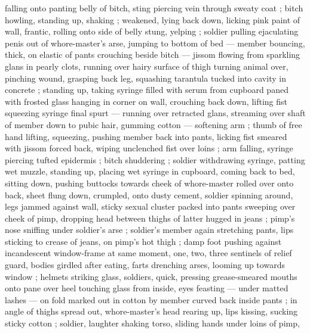 falling onto panting belly of bitch, sting piercing vein through sweaty coat ; bitch howling, standing up, shaking ; weakened, lying back down, licking pink paint of wall, frantic, rolling onto side of belly stung, yelping ; soldier pulling ejaculating penis out of whore-master's arse, jumping to bottom of bed --- member bouncing, thick, on elastic of pants {\dashcom} crouching beside bitch --- jissom flowing from sparkling glans in pearly clots, running over hairy surface of thigh {\dashcom} turning animal over, pinching wound, grasping back leg, squashing tarantula tucked into cavity in concrete ; standing up, taking syringe filled with serum from cupboard paned with frosted glass hanging in corner on wall, crouching back down, lifting fist squeezing syringe {\col} final spurt --- running over retracted glans, streaming over shaft of member down to pubic hair, gumming cotton --- softening arm ; thumb of free hand lifting, squeezing, pushing member back into pants, licking fist smeared with jissom forced back, wiping unclenched fist over loins ; arm falling, syringe piercing tufted epidermis ; bitch shuddering ; soldier withdrawing syringe, patting wet muzzle, standing up, placing wet syringe in cupboard, coming back to bed, sitting down, pushing buttocks towards cheek of whore-master rolled over onto back, sheet flung down, crumpled, onto dusty cement, soldier spinning around, legs jammed against wall, sticky sexual cluster packed into pants sweeping over cheek of pimp, dropping head between thighs of latter hugged in jeans ; pimp's nose sniffing under soldier's arse ; soldier's member again stretching pants, lips sticking to crease of jeans, on pimp's hot thigh ; damp foot pushing against incandescent window-frame {\col} at same moment, one, two, three sentinels of relief guard, bodies girdled after eating, farts drenching arses, looming up towards window ; helmets striking glass, soldiers, quick, pressing grease-smeared mouths onto pane over heel touching glass from inside, eyes feasting --- under matted lashes --- on fold marked out in cotton by member curved back inside pants ; in angle of thighs spread out, whore-master's head rearing up, lips kissing, sucking sticky cotton ; soldier, laughter shaking torso, sliding hands under loins of pimp,
